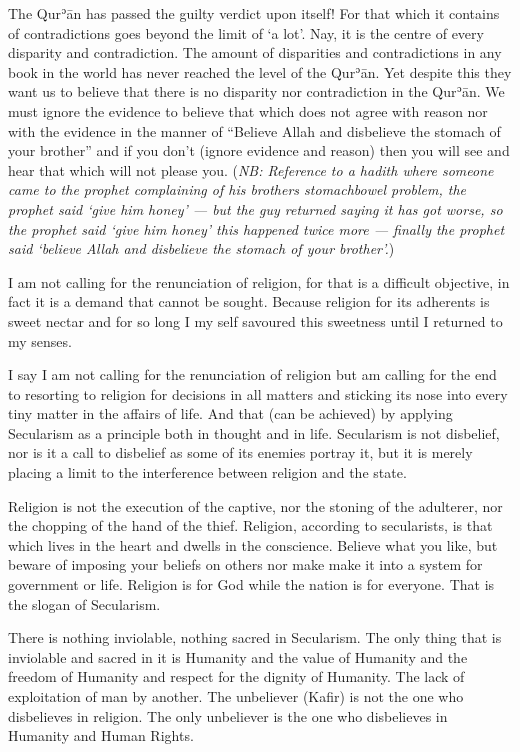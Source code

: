 \documentclass[12pt]{memoir}
\def\´{ʾ} %
\def \Quran{Qur\-\´ān} %
\let \Qrn=\Quran      %
\def\/{\discretionary{/}{}{/}}
\newcommand{\NB}[1]{\emph{\small NB: #1}}
\begin{document}
The \Qrn{} has passed the guilty verdict upon itself! For that which it
contains of contradictions goes beyond the limit of ‘a lot’. Nay, it is the
centre of every disparity and contradiction. The amount of disparities and
contradictions in any book in the world has never reached the level of the
\Quran. Yet despite this they want us to believe that there is no disparity nor
contradiction in the \Quran. We must ignore the evidence to believe that which
does not agree with reason nor with the evidence in the manner of “Believe
Allah and disbelieve the stomach of your brother”
and if you don’t (ignore evidence and reason) then you will see and hear that
which will not please you.
(\NB{Reference to a hadith where someone came to the prophet complaining of his
brothers stomach\/bowel problem, the prophet said ‘give him honey’ —
but the guy
returned saying it has got worse, so the prophet said ‘give him honey’ this
happened twice more — finally the prophet said ‘believe Allah and disbelieve
the stomach of your brother’.})

I am not calling for the renunciation of religion, for that is a difficult
objective, in fact it is a demand that cannot be sought. Because religion for
its adherents is sweet nectar and for so long I my self savoured this sweetness
until I returned to my senses.

I say I am not calling for the renunciation of religion but am calling for the
end to resorting to religion for decisions in all matters and sticking its nose
into every tiny matter in the affairs of life. And that (can be achieved) by
applying Secularism as a principle both in thought and in life. Secularism is
not disbelief, nor is it a call to disbelief as some of its enemies portray
it, but it is merely placing a limit to the interference between religion and
the state.

Religion is not the execution of the captive, nor the stoning of the adulterer,
nor the chopping of the hand of the thief. Religion, according to secularists,
is that which lives in the heart and dwells in the conscience. Believe what you
like, but beware of imposing your beliefs on others nor make make it into a
system for government or life. Religion is for God while the nation is for
everyone. That is the slogan of Secularism.

There is nothing inviolable, nothing sacred in Secularism. The only thing that
is inviolable and sacred in it is Humanity and the value of Humanity and the
freedom of Humanity and respect for the dignity of Humanity. The lack of
exploitation of man by another. The unbeliever (Kafir) is not the one who
disbelieves in religion. The only unbeliever is the one who disbelieves in
Humanity and Human Rights.
\end{document}
